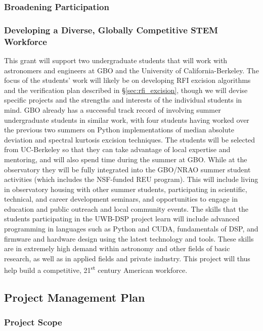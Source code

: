 \documentclass[10pt]{myNSF}
\begin{document}
\subsubsection{Broadening Participation}
\label{sec:participation}

\subsubsection{Developing a Diverse, Globally Competitive STEM
  Workforce}
\label{sec:workforce}

This grant will support two undergraduate students that will work with
astronomers and engineers at GBO and the University of
California-Berkeley.  The focus of the students' work will likely be
on developing RFI excision algorithms and the verification plan
described in \S\ref{sec:rfi_excision}, though we will devise specific
projects and the strengths and interests of the individual students in
mind.  GBO already has a successful track record of involving summer
undergraduate students in similar work, with four students having
worked over the previous two summers on Python implementations of
median absolute deviation and spectral kurtosis excision techniques.
The students will be selected from UC-Berkeley so that they can take
advantage of local expertise and mentoring, and will also spend time
during the summer at GBO.  While at the observatory they will be fully
integrated into the GBO/NRAO summer student activities (which includes
the NSF-funded REU program).  This will include living in observatory
housing with other summer students, participating in scientific,
technical, and career development seminars, and opportunities to
engage in education and public outreach and local community events.
The skills that the students participating in the UWB-DSP project
learn will include advanced programming in languages such as Python
and CUDA, fundamentals of DSP, and firmware and hardware design using
the latest technology and tools.  These skills are in extremely high
demand within astronomy and other fields of basic research, as well as
in applied fields and private industry.  This project will thus help
build a competitive, 21\textsuperscript{st} century American workforce.

\subsection{Project Management Plan}
\label{sec:plan}

\subsubsection{Project Scope}
\label{sec:scope}
\end{document}

